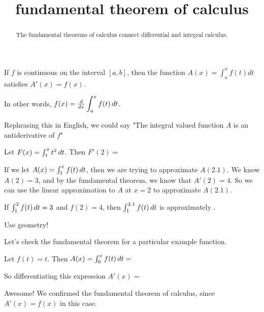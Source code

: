 \documentclass{ximera}
\title{fundamental theorem of calculus}
\begin{document}
\begin{abstract}
  The fundamental theorems of calculus connect differential and integral calculus.
\end{abstract}

\maketitle

\begin{theorem}
If $f$ is continuous on the interval $[a,b]$, then the function $A(x) = \displaystyle \int_a^x f(t)dt$ satisfies $A'(x) = f(x)$.

In other words, $f(x) = \frac{d}{dx} \displaystyle \int_a^x f(t) \,d t$.
\end{theorem}

Rephrasing this in English, we could say "The integral valued function $A$ is an antiderivative of $f$"


\begin{question}
	Let $F(x) = \int_1^x t^2 \,d t$.  Then $F'(2)=$ 
\end{question}

\begin{question}
	\begin{hint}
		If we let $A(x) = \int_1^x f(t) \,d t$, then we are trying to approximate $A(2.1)$.  We know $A(2)=3$, and by the fundamental theorem, we know that $A'(2) = 4$.  So we can use the linear approximation to $A$ at $x=2$ to approximate $A(2.1)$.
	\end{hint}
	If $\int_1^2 f(t) \,d t = 3$ and $f(2) = 4$, then $\int_1^{2.1} f(t) \,d t $ is approximately .   
\end{question}

\begin{question}
\begin{hint}
	Use geometry!
\end{hint}
Let's check the fundamental theorem for a particular example function.

Let $f(t) = t$.  Then $A(x) = \int_0^x f(t) \,d t=$
\end{question}

\begin{question}
	\begin{solution}
	 So differentiating this expression $A'(x) =$
	 \end{solution}
Awesome!  We confirmed the fundamental theorem of calculus, since $A'(x) = f(x)$ in this case.
 
\end{question}
\end{document}
